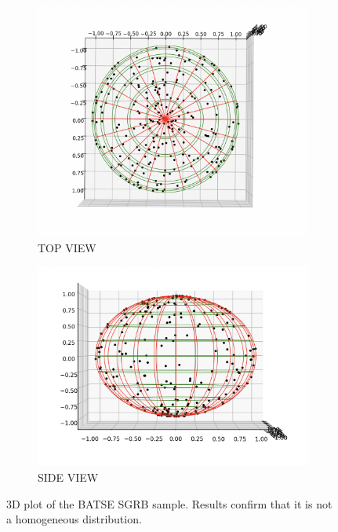 \documentclass[12pt]{article}
\begin{document}
\begin{figure}[h]
  \begin{subfigure}{.5\textwidth}
  \centering
    \includegraphics[width=1\linewidth]{BATSE SGRB 3D.png}
    \caption{TOP VIEW}
  \end{subfigure}%
  \begin{subfigure}{.5\textwidth}
  \centering
    \includegraphics[width=1\linewidth]{BATSE SGRB 3DD.png}
    \caption{SIDE VIEW}
  \end{subfigure}
  \caption{3D plot of the BATSE SGRB sample. Results confirm that it is not a homogeneous distribution.}
\end{figure}
\end{document}
